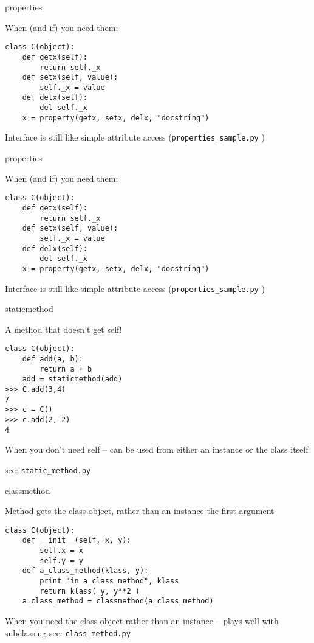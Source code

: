 \documentclass{beamer}
\begin{document}
\begin{frame}[fragile]{properties}

{ \Large When (and if) you need them: }

\begin{verbatim}
class C(object):
    def getx(self):
        return self._x
    def setx(self, value):
        self._x = value
    def delx(self):
        del self._x
    x = property(getx, setx, delx, "docstring")
\end{verbatim}
{\Large Interface is still like simple attribute access}
(\verb|properties_sample.py| )
\end{frame} 


\begin{frame}[fragile]{properties}

{ \Large When (and if) you need them: }

\begin{verbatim}
class C(object):
    def getx(self):
        return self._x
    def setx(self, value):
        self._x = value
    def delx(self):
        del self._x
    x = property(getx, setx, delx, "docstring")
\end{verbatim}
{\Large Interface is still like simple attribute access}
(\verb|properties_sample.py| )
\end{frame} 

\begin{frame}[fragile]{staticmethod}

{ \Large A method that doesn't get self! }

\begin{verbatim}
class C(object):
    def add(a, b):
        return a + b
    add = staticmethod(add)
>>> C.add(3,4)
7
>>> c = C()
>>> c.add(2, 2)
4
\end{verbatim}
{\Large When you don't need self -- can be used from either an instance or the class itself}

\vfill
see: \verb|static_method.py|
\end{frame} 

\begin{frame}[fragile]{classmethod}

{ \Large Method gets the class object, rather than an instance the first argument}

\begin{verbatim}
class C(object):
    def __init__(self, x, y):
        self.x = x
        self.y = y
    def a_class_method(klass, y):
        print "in a_class_method", klass
        return klass( y, y**2 )
    a_class_method = classmethod(a_class_method)
\end{verbatim}
{\Large When you need the class object rather than an instance -- plays well with subclassing}
\vfill
see: \verb|class_method.py|
\end{frame} 
\end{document}
